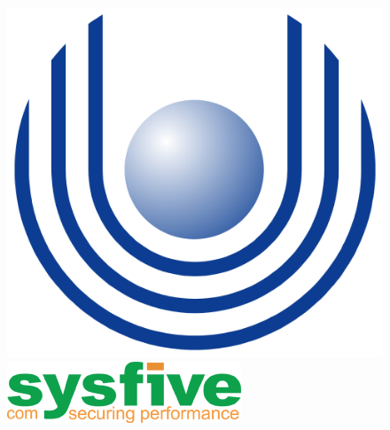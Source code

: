 \title{\titel}
\author{\autor}

\setcounter{secnumdepth}{3}
\setcounter{tocdepth}{3}

\if@twoside
  \fancyfoot[OR]{}
  \fancyfoot[EL]{}
  \fancyfoot[OL]{}
  \fancyfoot[ER]{}

\else
  \fancyfoot[R]{}
  \fancyfoot[L]{}
\fi

\begin{titlepage}
\begin{figure}
    \begin{minipage}{0.2\textwidth}
        \begin{flushleft}
            \includegraphics[scale=0.20]{images/logo_left.png}
        \end{flushleft}
    \end{minipage}
    \begin{minipage}{0.55\textwidth}
        \centering
        \hspace{0.25cm}
    \end{minipage}
    \begin{minipage}{0.2\textwidth}
        \begin{flushleft}
            \includegraphics[scale=0.4]{images/logo_right.png}

\end{flushleft}
\end{minipage}
\end{figure}
\end{titlepage}
